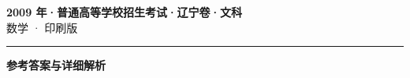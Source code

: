 \documentclass[zihao=5, a4paper]{ctexart}
\begin{document}
\begin{center}
  {\Large\bfseries 2009 年·普通高等学校招生考试·辽宁卷·文科}\\[4pt]
  {\large 数学 · 印刷版}
\end{center}
\medskip
{}

\par\bigskip\hrule\bigskip
{}
\begin{center}{\large\bfseries 参考答案与详细解析}\end{center}
\smallskip

\end{document}
